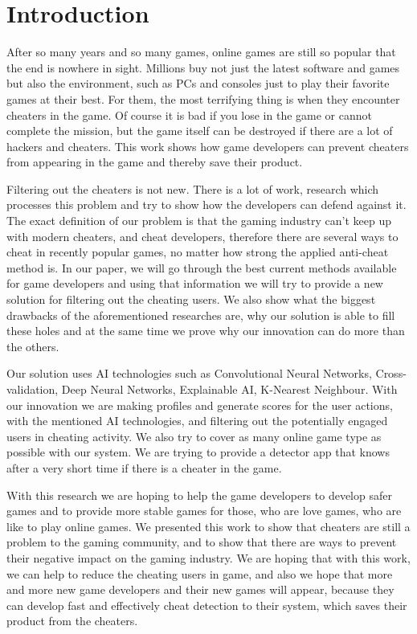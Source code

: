 \chapter{Introduction}
\label{ch:intro}

After so many years and so many games, online games are still so popular that the end is nowhere in sight.
Millions buy not just the latest software and games but also the environment, such as PCs and consoles just to play their favorite games at their best.
For them, the most terrifying thing is when they encounter cheaters in the game.
Of course it is bad if you lose in the game or cannot complete the mission, but the game itself can be destroyed if there are a lot of hackers and cheaters.
This work shows how game developers can prevent cheaters from appearing in the game and thereby save their product.

Filtering out the cheaters is not new. 
There is a lot of work, research which processes this problem and try to show how the developers can defend against it.
The exact definition of our problem is that the gaming industry can't keep up with modern cheaters, and cheat developers, therefore there are several ways to cheat in recently popular games, no matter how strong the applied anti-cheat method is. 
In our paper, we will go through the best current methods available for game developers and using that information we will try to provide a new solution for filtering out the cheating users.
We also show what the biggest drawbacks of the aforementioned researches are, why our solution is able to fill these holes and at the same time we prove why our innovation can do more than the others.

Our solution uses AI technologies such as Convolutional Neural Networks, Cross-validation, Deep Neural Networks, Explainable AI, K-Nearest Neighbour.
With our innovation we are making profiles and generate scores for the user actions, with the mentioned AI technologies, and filtering out the potentially engaged users in cheating activity. 
We also try to cover as many online game type as possible with our system. We are trying to provide a detector app that knows after a very short time if there is a cheater in the game.

With this research we are hoping to help the game developers to develop safer games and to provide more stable games for those, who are love games, who are like to play online games.
We presented this work to show that cheaters are still a problem to the gaming community, and to show that there are ways to prevent their negative impact on the gaming industry.
We are hoping that with this work, we can help to reduce the cheating users in game, and also we hope that more and more new game developers and their new games will appear, because they can develop fast and effectively cheat detection to their system, which saves their product from the cheaters.

